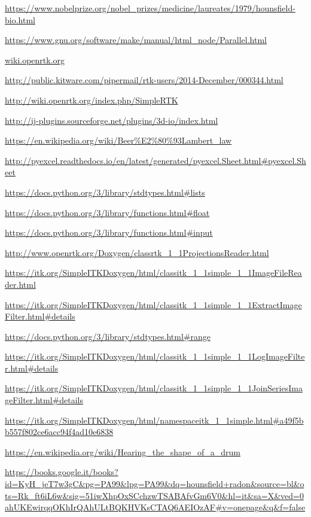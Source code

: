 \documentclass[a4paper,12pt, doubleside]{report}
\begin{document}
\begin{thebibliography}{1}
        \url{https://www.nobelprize.org/nobel_prizes/medicine/laureates/1979/hounsfield-bio.html}
    
        \url{https://www.gnu.org/software/make/manual/html_node/Parallel.html}
        
        \url{wiki.openrtk.org}
        
        \url{http://public.kitware.com/pipermail/rtk-users/2014-December/000344.html}
        
        \url{http://wiki.openrtk.org/index.php/SimpleRTK}
        
        \url{http://ij-plugins.sourceforge.net/plugins/3d-io/index.html}
    
        \url{https://en.wikipedia.org/wiki/Beer%E2%80%93Lambert_law}
        
        \url{http://pyexcel.readthedocs.io/en/latest/generated/pyexcel.Sheet.html#pyexcel.Sheet}
        
        \url{https://docs.python.org/3/library/stdtypes.html#lists}
        
        \url{https://docs.python.org/3/library/functions.html#float}
        
        \url{https://docs.python.org/3/library/functions.html#input}
        
        \url{http://www.openrtk.org/Doxygen/classrtk_1_1ProjectionsReader.html}
    
        \url{https://itk.org/SimpleITKDoxygen/html/classitk_1_1simple_1_1ImageFileReader.html}
    
        \url{https://itk.org/SimpleITKDoxygen/html/classitk_1_1simple_1_1ExtractImageFilter.html#details}
    
        \url{https://docs.python.org/3/library/stdtypes.html#range}
        
        \url{https://itk.org/SimpleITKDoxygen/html/classitk_1_1simple_1_1LogImageFilter.html#details}
        
        \url{https://itk.org/SimpleITKDoxygen/html/classitk_1_1simple_1_1JoinSeriesImageFilter.html#details}
        
        \url{https://itk.org/SimpleITKDoxygen/html/namespaceitk_1_1simple.html#a49f5bb557f802ce6acc94f4ad10e6838}
        
        \url{https://en.wikipedia.org/wiki/Hearing_the_shape_of_a_drum}
        
        \url{https://books.google.it/books?id=KyH_jeT7w3gC&pg=PA99&lpg=PA99&dq=hounsfield+radon&source=bl&ots=Rk_ft6iL6w&sig=51iwXhpOxSCchzwTSABAfvGm6V0&hl=it&sa=X&ved=0ahUKEwirqqOKhIrQAhULtBQKHVKsCTAQ6AEIOzAF#v=onepage&q&f=false}
        
    \end{thebibliography}
\end{document}
